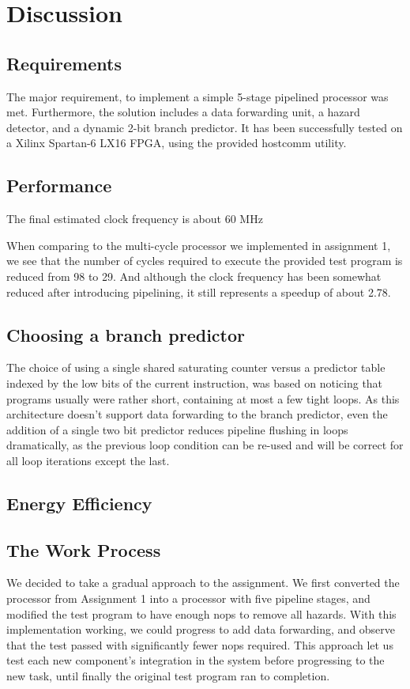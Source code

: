 \chapter{Discussion}

\section{Requirements}
The major requirement, to implement a simple 5-stage pipelined processor was met.
Furthermore, the solution includes a data forwarding unit, a hazard detector, and a dynamic 2-bit branch predictor.
It has been successfully tested on a Xilinx Spartan-6 LX16 FPGA, using the provided hostcomm\cite{hostcomm} utility.

\section{Performance}

The final estimated clock frequency is about 60 MHz 

When comparing to the multi-cycle processor we implemented in assignment 1, we see that the number of cycles required to execute the provided test program is reduced from 98 to 29.
And although the clock frequency has been somewhat reduced after introducing pipelining, it still represents a speedup of about 2.78.


\section{Choosing a branch predictor}
The choice of using a single shared saturating counter versus a predictor table indexed by the low bits of the current instruction, was based on noticing that programs usually were rather short, containing at most a few tight loops.
As this architecture doesn't support data forwarding to the branch predictor, even the addition of a single two bit predictor reduces pipeline flushing in loops dramatically, as the previous loop condition can be re-used and will be correct for all loop iterations except the last.

\section{Energy Efficiency}

\section{The Work Process}
We decided to take a gradual approach to the assignment.
We first converted the processor from Assignment 1 into a processor with five pipeline stages, and modified the test program to have enough nops to remove all hazards.
With this implementation working, we could progress to add data forwarding, and observe that the test passed with significantly fewer nops required.
This approach let us test each new component's integration in the system before progressing to the new task, until finally the original test program ran to completion.

